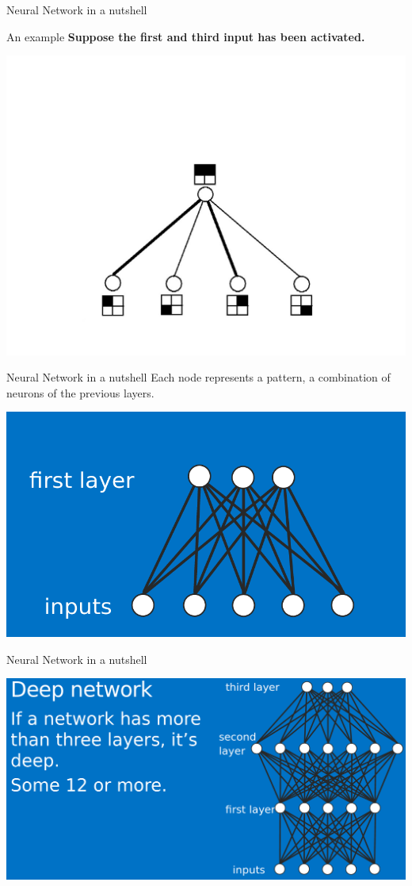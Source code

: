 \documentclass[10pt]{beamer}
\begin{document}
	\begin{frame}[c]{Neural Network in a nutshell}
		\begin{block}{An example}
			\textbf{Suppose the first and third input has been activated.}
			\begin{center}
			\includegraphics[width=0.8\linewidth]{images/sonn10}
			\end{center}
		\end{block}
	\end{frame}
	\begin{frame}[c]{Neural Network in a nutshell}
		\large{Each node represents a pattern, a combination of neurons of the previous layers.}
		\begin{center}
			\includegraphics[width=\linewidth]{images/sonn11}
		\end{center}
	\end{frame}
	\begin{frame}[c]{Neural Network in a nutshell}
		\begin{center}
			\includegraphics[width=\linewidth]{images/sonn12}
		\end{center}
	\end{frame}
\end{document}
